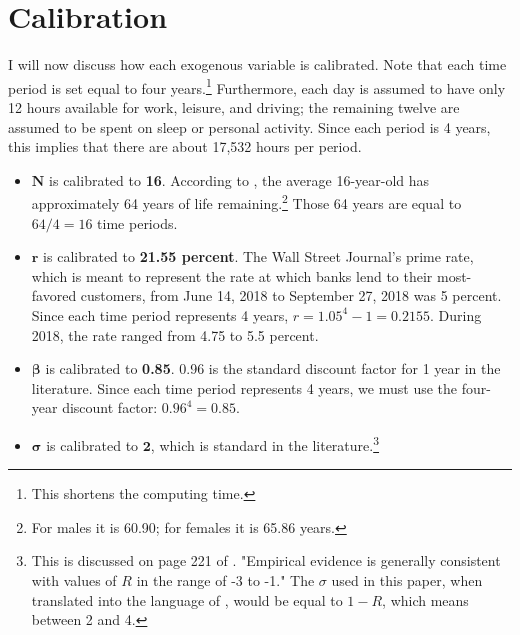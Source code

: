 \documentclass[letter, 12pt, epsf,leqno]{article}
\begin{document}
\section{Calibration}\label{sec:calibrate}

I will now discuss how each exogenous variable is calibrated.  Note that each time period is set equal to four years.\footnote{This shortens the computing time.}  Furthermore, each day is assumed to have only 12 hours available for work, leisure, and driving; the remaining twelve are assumed to be spent on sleep or personal activity.  Since each period is 4 years, this implies that there are about 17,532 hours per period.
\begin{itemize}
\item$\boldsymbol{N}$ is calibrated to \textbf{16}.  According to \citet{ssa}, the average 16-year-old has approximately 64 years of life remaining.\footnote{For males it is 60.90; for females it is 65.86 years.}  Those 64 years are equal to $64/4=16$ time periods.  \\  
\item $\boldsymbol{r}$ is calibrated to \textbf{21.55 percent}.  The Wall Street Journal's prime rate, which is meant to represent the rate at which banks lend to their most-favored customers, from June 14, 2018 to September 27, 2018 was 5 percent.  Since each time period represents 4 years, $r = 1.05^4-1 = 0.2155$.  During 2018, the rate ranged from 4.75 to 5.5 percent.  \citep{prime} \\
\item $\boldsymbol{\beta}$ is calibrated to \textbf{0.85}.  0.96 is the standard discount factor for 1 year in the literature.  Since each time period represents 4 years, we must use the four-year discount factor: $0.96^4=0.85$.\\ %
\item $\boldsymbol{\sigma}$ is calibrated to $\boldsymbol{2}$, which is standard in the literature.\footnote{This is discussed on page 221 of \citet{nicholson}.  "Empirical evidence is generally consistent with values of $R$ in the range of -3 to -1."  The $\sigma$ used in this paper, when translated into the language of \citet{nicholson},  would be equal to $1-R$, which means between 2 and 4.}%

\end{itemize}
\end{document}
